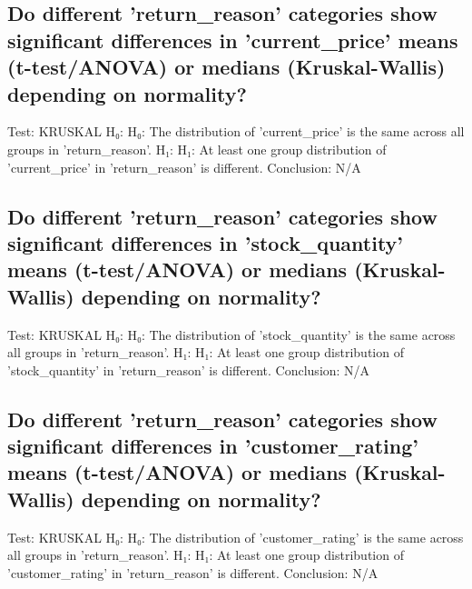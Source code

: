 \documentclass{article}%
\begin{document}
%
\subsection{Do different 'return\_reason' categories show significant differences in 'current\_price' means (t{-}test/ANOVA) or medians (Kruskal{-}Wallis) depending on normality?}%
\label{subsec:Dodifferentreturnreasoncategoriesshowsignificantdifferencesincurrentpricemeans(t{-}test/ANOVA)ormedians(Kruskal{-}Wallis)dependingonnormality?}%
Test: KRUSKAL\newline%
H₀: H₀: The distribution of 'current\_price' is the same across all groups in 'return\_reason'.\newline%
H₁: H₁: At least one group distribution of 'current\_price' in 'return\_reason' is different.\newline%
Conclusion: N/A

%
\subsection{Do different 'return\_reason' categories show significant differences in 'stock\_quantity' means (t{-}test/ANOVA) or medians (Kruskal{-}Wallis) depending on normality?}%
\label{subsec:Dodifferentreturnreasoncategoriesshowsignificantdifferencesinstockquantitymeans(t{-}test/ANOVA)ormedians(Kruskal{-}Wallis)dependingonnormality?}%
Test: KRUSKAL\newline%
H₀: H₀: The distribution of 'stock\_quantity' is the same across all groups in 'return\_reason'.\newline%
H₁: H₁: At least one group distribution of 'stock\_quantity' in 'return\_reason' is different.\newline%
Conclusion: N/A

%
\subsection{Do different 'return\_reason' categories show significant differences in 'customer\_rating' means (t{-}test/ANOVA) or medians (Kruskal{-}Wallis) depending on normality?}%
\label{subsec:Dodifferentreturnreasoncategoriesshowsignificantdifferencesincustomerratingmeans(t{-}test/ANOVA)ormedians(Kruskal{-}Wallis)dependingonnormality?}%
Test: KRUSKAL\newline%
H₀: H₀: The distribution of 'customer\_rating' is the same across all groups in 'return\_reason'.\newline%
H₁: H₁: At least one group distribution of 'customer\_rating' in 'return\_reason' is different.\newline%
Conclusion: N/A
\end{document}
